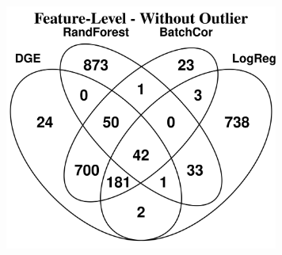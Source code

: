\begin{columns}
{\begin{minipage}{20cm}
        \includegraphics[width=9cm]{features_without_outlier.png}
        
\end{minipage}

}
\end{columns}
